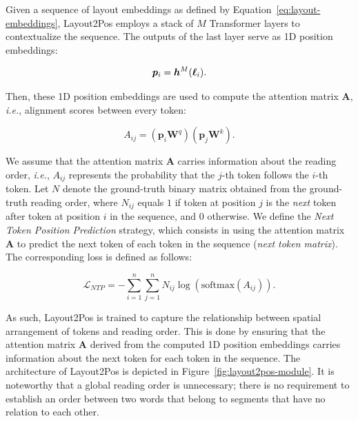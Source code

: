 Given a sequence of layout embeddings as defined by Equation~\ref{eq:layout-embeddings}, Layout2Pos employs a stack of $M$ Transformer layers to contextualize the sequence. The outputs of the last layer serve as 1D position embeddings:

\begin{equation}
  \bm{p}_i = \bm{h}^M(\boldsymbol{\ell}_i).
\end{equation}

\noindent Then, these 1D position embeddings are used to compute the attention matrix $\bm{A}$, \textit{i.e.}, alignment scores between every token:

\begin{equation}
  A_{ij} = \left(\bm{p}_i \bm{W}^q\right)\left(\bm{p}_j \bm{W}^k\right).
\end{equation}

\noindent We assume that the attention matrix $\bm{A}$ carries information about the reading order, \textit{i.e.}, $A_{ij}$ represents the probability that the $j$-th token follows the $i$-th token. Let $N$ denote the ground-truth binary matrix obtained from the ground-truth reading order, where $N_{ij}$ equals $1$ if token at position $j$ is the \textit{next} token after token at position $i$ in the sequence, and $0$ otherwise. We define the \textit{Next Token Position Prediction} strategy, which consists in using the attention matrix $\bm{A}$ to predict the next token of each token in the sequence (\textit{next token matrix}). The corresponding loss is defined as follows:

\begin{equation}
  \mathcal{L}_{NTP} = - \sum_{i=1}^n \sum_{j=1}^n N_{ij} \log\left(\textrm{softmax}(A_{ij})\right).
\end{equation}

\noindent As such, Layout2Pos is trained to capture the relationship between spatial arrangement of tokens and reading order. This is done by ensuring that the attention matrix $\bm{A}$ derived from the computed 1D position embeddings carries information about the next token for each token in the sequence. The architecture of Layout2Pos is depicted in Figure~\ref{fig:layout2pos-module}. It is noteworthy that a global reading order is unnecessary; there is no requirement to establish an order between two words that belong to segments that have no relation to each other.


